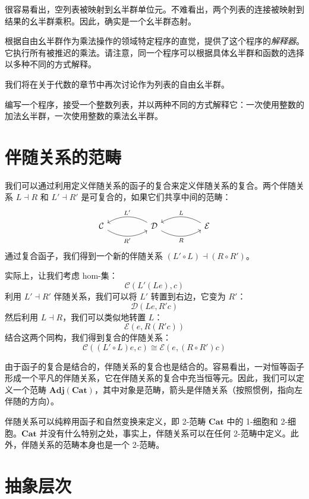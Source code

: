 \documentclass[DaoFP]{subfiles}
\begin{document}
很容易看出，空列表被映射到幺半群单位元。不难看出，两个列表的连接被映射到结果的幺半群乘积。因此，确实是一个幺半群态射。

根据自由幺半群作为乘法操作的领域特定程序的直觉，提供了这个程序的\emph{解释器}。它执行所有被推迟的乘法。请注意，同一个程序可以根据具体幺半群和函数的选择以多种不同的方式解释。

我们将在关于代数的章节中再次讨论作为列表的自由幺半群。

\begin{exercise}
编写一个程序，接受一个整数列表，并以两种不同的方式解释它：一次使用整数的加法幺半群，一次使用整数的乘法幺半群。
\end{exercise}

\section{伴随关系的范畴}
我们可以通过利用定义伴随关系的函子的复合来定义伴随关系的复合。两个伴随关系 $L \dashv R$ 和 $L' \dashv R'$ 是可复合的，如果它们共享中间的范畴：
\[
 \begin{tikzcd}
  \mathcal{C}
  \arrow[rr, bend right, "R'"']
  &&
  \mathcal{D}
  \arrow[ll, bend right, "L'"']
    \arrow[rr, bend right, "R"']
&&
  \mathcal{E}
  \arrow[ll, bend right, "L"']
 \end{tikzcd}
\]
通过复合函子，我们得到一个新的伴随关系 $(L' \circ L) \dashv (R \circ R')$。

实际上，让我们考虑 hom-集：
\[ \mathcal{C}(L' (L e), c) \]
利用 $L' \dashv R'$ 伴随关系，我们可以将 $L'$ 转置到右边，它变为 $R'$：
\[ \mathcal{D}(L e, R' c) \]
然后利用 $L \dashv R$，我们可以类似地转置 $L$：
\[ \mathcal{E}( e, R(R' c)) \]
结合这两个同构，我们得到复合的伴随关系：
\[ \mathcal{C}((L' \circ L) e, c) \cong \mathcal{E}( e, (R \circ R') c)\]

由于函子的复合是结合的，伴随关系的复合也是结合的。容易看出，一对恒等函子形成一个平凡的伴随关系，它在伴随关系的复合中充当恒等元。因此，我们可以定义一个范畴 $\mathbf{Adj}(\mathbf{Cat})$，其中对象是范畴，箭头是伴随关系（按照惯例，指向左伴随的方向）。

伴随关系可以纯粹用函子和自然变换来定义，即 2-范畴 $\mathbf{Cat}$ 中的 1-细胞和 2-细胞。$\mathbf{Cat}$ 并没有什么特别之处，事实上，伴随关系可以在任何 2-范畴中定义。此外，伴随关系的范畴本身也是一个 2-范畴。

\section{抽象层次}
\end{document}
